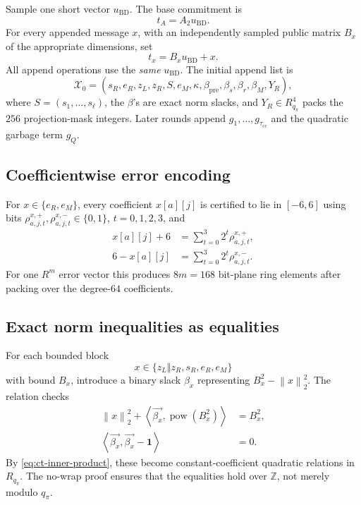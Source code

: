 \documentclass[11pt,a4paper]{article}
\newcommand{\Z}{\mathbb{Z}}
\newcommand{\Rpi}{R_{q_{\pi}}}
\newcommand{\proofmod}{q_{\pi}}
\newcommand{\powvec}{\operatorname{pow}}
\newcommand{\vecx}[1]{\overrightarrow{#1}}
\newcommand{\norm}[1]{\left\lVert #1\right\rVert}
\newcommand{\inner}[2]{\left\langle #1,#2\right\rangle}
\newcommand{\concat}{\mathbin\Vert}
\newcommand{\one}{\mathbf{1}}
\begin{document}
Sample one short vector \(u_{\mathrm{BD}}\).  The base commitment is
\begin{equation}
  t_A=A_2u_{\mathrm{BD}}.
  \label{eq:BDLOP-base}
\end{equation}
For every appended message \(x\), with an independently sampled public matrix
\(B_x\) of the appropriate dimensions, set
\begin{equation}
  t_x=B_xu_{\mathrm{BD}}+x.
  \label{eq:BDLOP-append}
\end{equation}
All append operations use the \emph{same} \(u_{\mathrm{BD}}\).  The initial
append list is
\begin{equation}
 \mathcal X_0=(s_R,e_R,z_L,z_R,S,e_M,\kappa,
              \beta_{\mathrm{pre}},\beta_s,\beta_r,\beta_M,Y_R),
 \label{eq:initial-appends}
\end{equation}
where \(S=(s_1,\ldots,s_\ell)\), the \(\beta\)'s are exact norm slacks, and
\(Y_R\in\Rpi^4\) packs the \(256\) projection-mask integers.  Later rounds
append \(g_1,\ldots,g_{\tau_{\mathrm{cc}}}\) and the quadratic garbage term
\(g_Q\).

\subsection{Coefficientwise error encoding}

For \(x\in\{e_R,e_M\}\), every coefficient \(x[a][j]\) is certified to lie in
\([-6,6]\) using bits
\(\rho^{x,+}_{a,j,t},\rho^{x,-}_{a,j,t}\in\{0,1\}\), \(t=0,1,2,3\), and
\begin{align}
  x[a][j]+6&=\sum_{t=0}^{3}2^t\rho^{x,+}_{a,j,t},
  \label{eq:range-plus}\\
  6-x[a][j]&=\sum_{t=0}^{3}2^t\rho^{x,-}_{a,j,t}.
  \label{eq:range-minus}
\end{align}
For one \(R^m\) error vector this produces \(8m=168\) bit-plane ring
elements after packing over the degree-\(64\) coefficients.

\subsection{Exact norm inequalities as equalities}

For each bounded block
\[
  x\in\{z_L\concat z_R,s_R,e_R,e_M\}
\]
with bound \(B_x\), introduce a binary slack \(\beta_x\) representing
\(B_x^2-\norm{x}_2^2\).  The relation checks
\begin{align}
  \norm{x}_2^2+\inner{\vecx{\beta_x}}{\powvec(B_x^2)}&=B_x^2,
  \label{eq:norm-slack}\\
  \inner{\vecx{\beta_x}}{\vecx{\beta_x}-\one}&=0.
  \label{eq:norm-slack-bits}
\end{align}
By \cref{eq:ct-inner-product}, these become constant-coefficient quadratic
relations in \(\Rpi\).  The no-wrap proof ensures that the equalities hold over
\(\Z\), not merely modulo \(\proofmod\).
\end{document}
